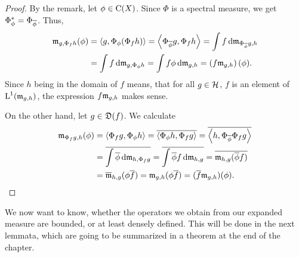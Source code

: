 \begin{proof}
 By the remark, let $\phi \in \operatorname{C}(X)$. Since $\Phi$ is a spectral measure,
 we get $\Phi_\phi ^{*} = \Phi_{\overline{\phi}}$. Thus,
 \begin{align*}
   \mathfrak{m}_{g, \Phi_f h}(\phi) &= \left\langle g, \Phi_\phi (\Phi_f h) \right\rangle 
			  = \left\langle \Phi_{\overline{\phi}}g , \Phi_f h \right\rangle
			  = \int f \operatorname{d}\! \mathfrak{m}_{\Phi_{\overline{\phi}} g, h}\\
			  &= \int f \operatorname{d}\! \mathfrak{m}_{g, \Phi_\phi h}
			  = \int f \phi \operatorname{d}\! \mathfrak{m}_{g,h}
			  = \left( f \mathfrak{m}_{g,h} \right)(\phi).
 \end{align*}
 Since $h$ being in the domain of $f$ means, that for all $g \in \mathcal{H}$,
 $f$ is an element of $ \text{L}^1(\mathfrak{m}_{g,h})$, the expression  $f \mathfrak{m}_{g,h} $ 
 makes sense.
 
 On the other hand, let $g \in \mathfrak{D}(f)$. We calculate
 \begin{align*}
   \mathfrak{m}_{\Phi_f g , h}(\phi) &= \left\langle \Phi_f g, \Phi_\phi h \right\rangle = 
   \overline{\left\langle \Phi_\phi h, \Phi_f g \right\rangle} =
   \overline{\left\langle h, \Phi_{\overline{\phi}} \Phi_f g \right\rangle}\\
   &= \overline{\int \overline{\phi} \operatorname{d}\! \mathfrak{m}_{h, \Phi_f g}}
   = \overline{\int \overline{\phi}f \operatorname{d}\! \mathfrak{m}_{h,  g}}
   = \overline{\mathfrak{m}_{h,g}(\overline{\phi}f)}\\
   &= \overline{\mathfrak{m}}_{h,g }(\phi \overline{f}) 
   = \mathfrak{m}_{g,h}(\phi \overline{f})
   = (\overline{f} \mathfrak{m}_{g,h})(\phi).
 \end{align*}

 
\end{proof}

We now want to know, whether the operators we obtain from our expanded measure
are bounded, or at least densely defined. This will be done in the next
lemmata, which are going to be summarized in a theorem at the end of the
chapter.

